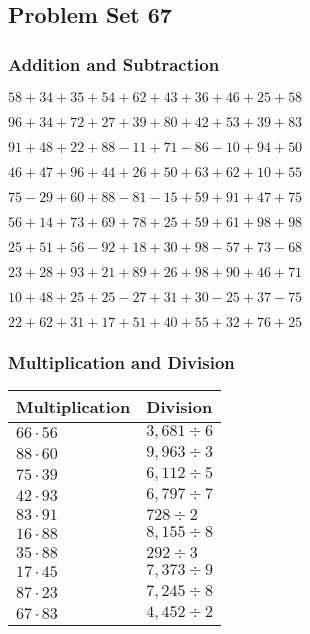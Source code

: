 \hypertarget{problem-set-67}{%
\subsection{Problem Set 67}\label{problem-set-67}}

\hypertarget{addition-and-subtraction}{%
\subsubsection{Addition and
Subtraction}\label{addition-and-subtraction}}

\(58+34+35+54+62+43+36+46+25+58\)

\(96+34+72+27+39+80+42+53+39+83\)

\(91+48+22+88-11+71-86-10+94+50\)

\(46+47+96+44+26+50+63+62+10+55\)

\(75-29+60+88-81-15+59+91+47+75\)

\(56+14+73+69+78+25+59+61+98+98\)

\(25+51+56-92+18+30+98-57+73-68\)

\(23+28+93+21+89+26+98+90+46+71\)

\(10+48+25+25-27+31+30-25+37-75\)

\(22+62+31+17+51+40+55+32+76+25\)

\hypertarget{multiplication-and-division}{%
\subsubsection{Multiplication and
Division}\label{multiplication-and-division}}

\begin{longtable}[]{@{}ll@{}}
\toprule
Multiplication & Division\tabularnewline
\midrule
\endhead
\(66\cdot56\) & \(3,681÷6\)\tabularnewline
\(88\cdot60\) & \(9,963÷3\)\tabularnewline
\(75\cdot39\) & \(6,112÷5\)\tabularnewline
\(42\cdot93\) & \(6,797÷7\)\tabularnewline
\(83\cdot91\) & \(728÷2\)\tabularnewline
\(16\cdot88\) & \(8,155÷8\)\tabularnewline
\(35\cdot88\) & \(292÷3\)\tabularnewline
\(17\cdot45\) & \(7,373÷9\)\tabularnewline
\(87\cdot23\) & \(7,245÷8\)\tabularnewline
\(67\cdot83\) & \(4,452÷2\)\tabularnewline
\bottomrule
\end{longtable}

